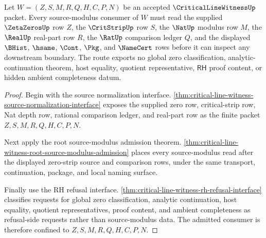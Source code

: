 \begin{theorem}
\label{thm:criticallinewitness-source-modulus-exclusion}
Let $W=(Z,S,M,R,Q,H,C,P,N)$ be an accepted $\CriticalLineWitnessUp$ packet. Every source-modulus consumer of $W$ must read the supplied $\ZetaZerosUp$ row $Z$, the $\CritStripUp$ row $S$, the $\NatUp$ modulus row $M$, the $\RealUp$ real-part row $R$, the $\RatUp$ comparison ledger $Q$, and the displayed $\BHist$, $\hsame$, $\Cont$, $\Pkg$, and $\NameCert$ rows before it can inspect any downstream boundary. The route exports no global zero classification, analytic-continuation theorem, host equality, quotient representative, $\mathsf{RH}$ proof content, or hidden ambient completeness datum.
\end{theorem}
\begin{proof}
Begin with the source normalization interface. \autoref{thm:critical-line-witness-source-normalization-interface} exposes the supplied zero row, critical-strip row, Nat depth row, rational comparison ledger, and real-part row as the finite packet $Z,S,M,R,Q,H,C,P,N$.

Next apply the root source-modulus admission theorem. \autoref{thm:critical-line-witness-root-source-modulus-admission} places every source-modulus read after the displayed zero-strip source and comparison rows, under the same transport, continuation, package, and local naming surface.

Finally use the RH refusal interface. \autoref{thm:critical-line-witness-rh-refusal-interface} classifies requests for global zero classification, analytic continuation, host equality, quotient representatives, proof content, and ambient completeness as refusal-side requests rather than source-modulus data. The admitted consumer is therefore confined to $Z,S,M,R,Q,H,C,P,N$.
\end{proof}

